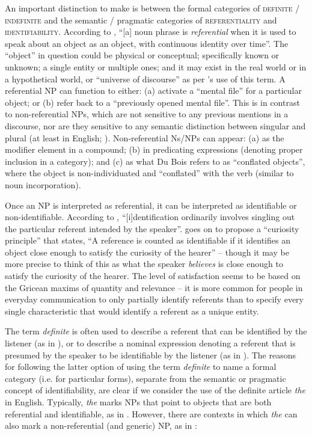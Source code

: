 \documentclass[output=paper]{langsci/langscibook}
\begin{document}
An important distinction to make is between the formal categories of \textsc{definite / indefinite} and the semantic / pragmatic categories of \textsc{referentiality} and \textsc{identifiability}. According to \cite[280]{DuBois1980}, “[a] noun phrase is \textit{referential} when it is used to speak about an object as an object, with continuous identity over time”. The “object” in question could be physical or conceptual; specifically known or unknown; a single entity or multiple ones; and it may exist in the real world or in a hypothetical world, or “universe of discourse” as per \citet[388]{Givon2001}'s use of this term. A referential NP can function to either: (a) activate a “mental file” for a particular object; or (b) refer back to a “previously opened mental file”. This is in contrast to non-referential NPs, which are not sensitive to any previous mentions in a discourse, nor are they sensitive to any semantic distinction between singular and plural (at least in English; \citealt[210]{DuBois1980}). Non-referential Ns/NPs can appear: (a) as the modifier element in a compound; (b) in predicating expressions (denoting proper inclusion in a category); and (c) as what Du Bois refers to as “conflated objects”, where the object is non-individuated and “conflated” with the verb (similar to noun incorporation).

Once an NP is interpreted as referential, it can be interpreted as identifiable or non-identifiable. According to \citet[232]{DuBois1980}, “[i]dentification ordinarily involves singling out the particular referent intended by the speaker”. \citet[233]{DuBois1980} goes on to propose a “curiosity principle” that states, “A reference is counted as identifiable if it identifies an object close enough to satisfy the curiosity of the hearer” – though it may be more precise to think of this as what the speaker \textit{believes} is close enough to satisfy the curiosity of the hearer. The level of satisfaction seems to be based on the Gricean maxims of quantity and relevance – it is more common for people in everyday communication to only partially identify referents than to specify every single characteristic that would identify a referent as a unique entity.

The term \textit{definite} is often used to describe a referent that can be identified by the listener (as in \citealt[65]{Comrie1989}), or to describe a nominal expression denoting a referent that is presumed by the speaker to be identifiable by the listener (as in \citealt[79]{Lambrecht1994}). The reasons for following the latter option of using the term \textit{definite} to name a formal category (i.e. for particular forms), separate from the semantic or pragmatic concept of identifiability, are clear if we consider the use of the definite article \textit{the} in English. Typically, \textit{the} marks NPs that point to objects that are both referential and identifiable, as in . However, there are contexts in which \textit{the} can also mark a non-referential (and generic) NP, as in :
\end{document}
